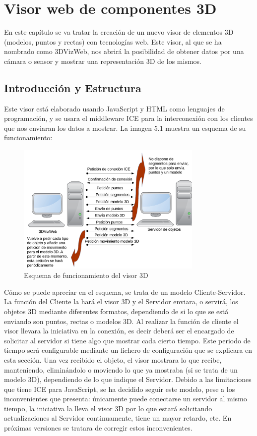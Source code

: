 \chapter{Visor web de componentes 3D }\label{cap.visor3d}
En este capítulo se va tratar la creación de un nuevo visor de elementos 3D (modelos, puntos y rectas) con tecnologías web. Este visor, al que se ha nombrado como 3DVizWeb, nos abrirá la posibilidad de obtener datos por una cámara o sensor y mostrar una representación 3D de los mismos.
\section{Introducción y Estructura}
Este visor está elaborado usando JavaScript y HTML como lenguajes de programación, y se usara el middleware ICE para la interconexión con los clientes que nos enviaran los datos a mostrar. La imagen 5.1 muestra un esquema de su funcionamiento:

\begin{figure}[H]
  \begin{center}
    \includegraphics[width=0.8\textwidth]{figures/esquemavisor.png}
		\caption{Esquema de funcionamiento del visor 3D}
		\label{fig.esquemavisor}
		\end{center}
\end{figure}

Cómo se puede apreciar en el esquema, se trata de un modelo Cliente-Servidor. La función del Cliente la hará el visor 3D y el Servidor enviara, o servirá, los objetos 3D mediante diferentes formatos, dependiendo de si lo que se está enviando son puntos, rectas o modelos 3D. Al realizar la función de cliente el visor llevara la iniciativa en la conexión, es decir deberá ser el encargado de solicitar al servidor si tiene algo que mostrar cada cierto tiempo. Este periodo de tiempo será configurable mediante un fichero de configuración que se explicara en esta sección.
Una vez recibido el objeto, el visor mostrara lo que recibe, manteniendo, eliminándolo o moviendo lo que ya mostraba (si se trata de un modelo 3D), dependiendo de lo que indique el Servidor.
Debido a las limitaciones que tiene ICE para JavaScript, se ha decidido seguir este modelo, pese a los inconvenientes que presenta: únicamente puede conectarse un servidor al mismo tiempo, la iniciativa la lleva el visor 3D por lo que estará solicitando actualizaciones al Servidor continuamente, tiene un mayor retardo, etc. En próximas versiones se tratara de corregir estos inconvenientes.

